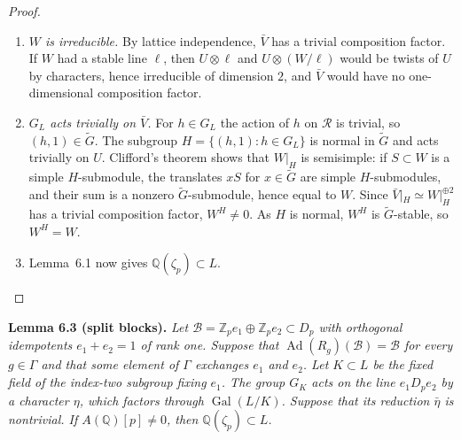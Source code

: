 \documentclass[11pt]{article}
\newcommand{\Q}{\mathbb Q}
\newcommand{\Z}{\mathbb Z}
\newcommand{\F}{\mathbb F}
\DeclareMathOperator{\Gal}{Gal}
\DeclareMathOperator{\Ad}{Ad}
\begin{document}
\begin{proof}
\begin{enumerate}
\(\lambda\in\Z_p^\times\). The \(\F_p\)-vector space \(U\) is a
one-dimensional \(\F_{p^2}\)-vector space, and \(M\) acts on it as
multiplication by an element of \(\F_{p^2}\setminus\F_p\). This
multiplication has no eigenvector over \(\F_p\), so \(U\) has no stable
line.
\item \emph{\(W\) is irreducible.} By lattice independence, \(\bar V\)
has a trivial composition factor. If \(W\) had a stable line \(\ell\),
then \(U\otimes\ell\) and \(U\otimes(W/\ell)\) would be twists of \(U\)
by characters, hence irreducible of dimension \(2\), and \(\bar V\)
would have no one-dimensional composition factor.
\item \emph{\(G_L\) acts trivially on \(\bar V\).} For \(h\in G_L\) the
action of \(h\) on \(\mathcal R\) is trivial, so
\((h,1)\in\widetilde G\). The subgroup \(H=\{(h,1):h\in G_L\}\) is
normal in \(\widetilde G\) and acts trivially on \(U\). Clifford's
theorem shows that \(W|_H\) is semisimple: if \(S\subset W\) is a
simple \(H\)-submodule, the translates \(xS\) for
\(x\in\widetilde G\) are simple \(H\)-submodules, and their sum is a
nonzero \(\widetilde G\)-submodule, hence equal to \(W\). Since
\(\bar V|_H\simeq W|_H^{\oplus2}\) has a trivial composition factor,
\(W^H\ne0\). As \(H\) is normal, \(W^H\) is \(\widetilde G\)-stable,
so \(W^H=W\).
\item Lemma~6.1 now gives \(\Q(\zeta_p)\subset L\).\qedhere
\end{enumerate}
\end{proof}

\noindent\textbf{Lemma 6.3 (split blocks).}
\emph{Let \(\mathcal B=\Z_pe_1\oplus\Z_pe_2\subset D_p\) with
orthogonal idempotents \(e_1+e_2=1\) of rank one. Suppose that
\(\Ad(R_g)(\mathcal B)=\mathcal B\) for every \(g\in\Gamma\) and that
some element of \(\Gamma\) exchanges \(e_1\) and \(e_2\). Let
\(K\subset L\) be the fixed field of the index-two subgroup fixing
\(e_1\). The group \(G_K\) acts on the line \(e_1D_pe_2\) by a
character \(\eta\), which factors through \(\Gal(L/K)\). Suppose that
its reduction \(\bar\eta\) is nontrivial. If \(A(\Q)[p]\ne0\), then
\(\Q(\zeta_p)\subset L\).}
\end{document}
